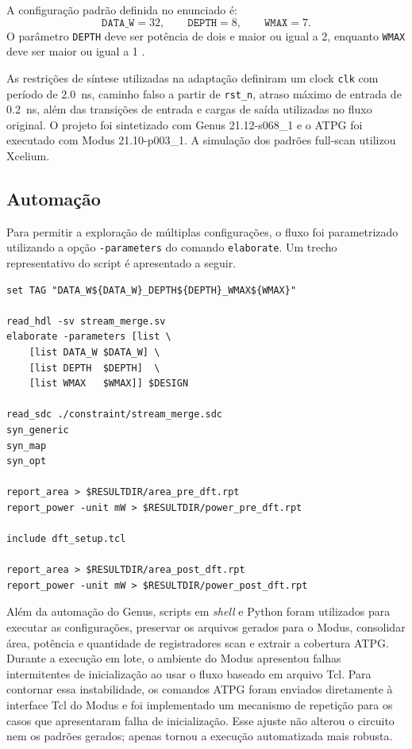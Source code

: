 \documentclass[conference]{IEEEtran}
\begin{document}
A configuração padrão definida no enunciado é:
\begin{equation}
\texttt{DATA\_W}=32, \qquad \texttt{DEPTH}=8, \qquad \texttt{WMAX}=7.
\end{equation}
O parâmetro \texttt{DEPTH} deve ser potência de dois e maior ou igual a 2, enquanto \texttt{WMAX} deve ser maior ou igual a 1 \cite{enunciado_t2}.

As restrições de síntese utilizadas na adaptação definiram um clock \texttt{clk} com período de \SI{2.0}{\nano\second}, caminho falso a partir de \texttt{rst\_n}, atraso máximo de entrada de \SI{0.2}{\nano\second}, além das transições de entrada e cargas de saída utilizadas no fluxo original. O projeto foi sintetizado com Genus 21.12-s068\_1 e o ATPG foi executado com Modus 21.10-p003\_1. A simulação dos padrões full-scan utilizou Xcelium.

\subsection{Automação}

Para permitir a exploração de múltiplas configurações, o fluxo foi parametrizado utilizando a opção \texttt{-parameters} do comando \texttt{elaborate}. Um trecho representativo do script é apresentado a seguir.

\begin{lstlisting}
set TAG "DATA_W${DATA_W}_DEPTH${DEPTH}_WMAX${WMAX}"

read_hdl -sv stream_merge.sv
elaborate -parameters [list \
    [list DATA_W $DATA_W] \
    [list DEPTH  $DEPTH]  \
    [list WMAX   $WMAX]] $DESIGN

read_sdc ./constraint/stream_merge.sdc
syn_generic
syn_map
syn_opt

report_area > $RESULTDIR/area_pre_dft.rpt
report_power -unit mW > $RESULTDIR/power_pre_dft.rpt

include dft_setup.tcl

report_area > $RESULTDIR/area_post_dft.rpt
report_power -unit mW > $RESULTDIR/power_post_dft.rpt
\end{lstlisting}

Além da automação do Genus, scripts em \textit{shell} e Python foram utilizados para executar as configurações, preservar os arquivos gerados para o Modus, consolidar área, potência e quantidade de registradores scan e extrair a cobertura ATPG. Durante a execução em lote, o ambiente do Modus apresentou falhas intermitentes de inicialização ao usar o fluxo baseado em arquivo Tcl. Para contornar essa instabilidade, os comandos ATPG foram enviados diretamente à interface Tcl do Modus e foi implementado um mecanismo de repetição para os casos que apresentaram falha de inicialização. Esse ajuste não alterou o circuito nem os padrões gerados; apenas tornou a execução automatizada mais robusta.
\end{document}
